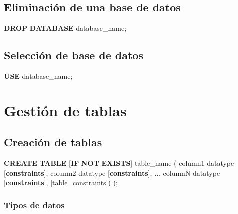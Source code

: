\documentclass[
]{book}
\newenvironment{Shaded}{\begin{snugshade}}{\end{snugshade}}
\newcommand{\ControlFlowTok}[1]{\textcolor[rgb]{0.13,0.29,0.53}{\textbf{#1}}}
\newcommand{\KeywordTok}[1]{\textcolor[rgb]{0.13,0.29,0.53}{\textbf{#1}}}
\newcommand{\NormalTok}[1]{#1}
\newcommand{\OperatorTok}[1]{\textcolor[rgb]{0.81,0.36,0.00}{\textbf{#1}}}
\theoremstyle{break}
\theoremstyle{nonumberplain}
\begin{document}
\subsection{Eliminación de una base de datos}\label{eliminaciuxf3n-de-una-base-de-datos}

\begin{Shaded}
\begin{Highlighting}[]
\KeywordTok{DROP} \KeywordTok{DATABASE}\NormalTok{ database\_name;}
\end{Highlighting}
\end{Shaded}

\subsection{Selección de base de datos}\label{selecciuxf3n-de-base-de-datos}

\begin{Shaded}
\begin{Highlighting}[]
\KeywordTok{USE}\NormalTok{ database\_name;}
\end{Highlighting}
\end{Shaded}

\section{Gestión de tablas}\label{gestiuxf3n-de-tablas}

\subsection{Creación de tablas}\label{creaciuxf3n-de-tablas}

\begin{Shaded}
\begin{Highlighting}[]
\KeywordTok{CREATE} \KeywordTok{TABLE}\NormalTok{ [}\ControlFlowTok{IF} \KeywordTok{NOT} \KeywordTok{EXISTS}\NormalTok{] table\_name (}
\NormalTok{  column1 datatype [}\KeywordTok{constraints}\NormalTok{],}
\NormalTok{  column2 datatype [}\KeywordTok{constraints}\NormalTok{],}
  \OperatorTok{..}\NormalTok{.}
\NormalTok{  columnN datatype [}\KeywordTok{constraints}\NormalTok{],}
\NormalTok{  [table\_constraints])}
\NormalTok{);}
\end{Highlighting}
\end{Shaded}

\subsubsection{Tipos de datos}\label{tipos-de-datos}
\end{document}
